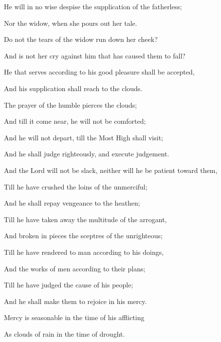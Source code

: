 {\par }{\Q {}He will in no wise despise the supplication of the fatherless;
\par }{\Q Nor the widow,
 when she pours out her tale.
\par }{\Q {}Do not the tears of the widow run down her cheek?
\par }{\Q And is not her cry against him that has caused them to fall?
\par }{\Q {}He that serves
{} according to his good pleasure shall be accepted,
\par }{\Q And his supplication shall reach to the clouds.
\par }{\Q {}The prayer of the humble pierces the clouds;
\par }{\Q And till it come near, he will not be comforted;
\par }{\Q And he will not depart, till the Most High shall visit;
\par }{\Q And he shall judge
 righteously, and execute judgement.
\par }{\Q {}And the Lord will not be slack, neither will he be patient toward them,
\par }{\Q Till he have crushed the loins of the unmerciful;
\par }{\Q And he shall repay vengeance to the heathen;
\par }{\Q Till he have taken away the multitude of the arrogant,
\par }{\Q And broken in pieces the sceptres of the unrighteous;
\par }{\Q {}Till he have rendered to
{} man according to his doings,
\par }{\Q And
{} the works of men according to their plans;
\par }{\Q Till he have judged the cause of his people;
\par }{\Q And he shall make them to rejoice in his mercy.
\par }{\Q {}Mercy is seasonable in the time of his afflicting
{}
\par }{\Q As clouds of rain in the time of drought.
\par }{\BB \par }
